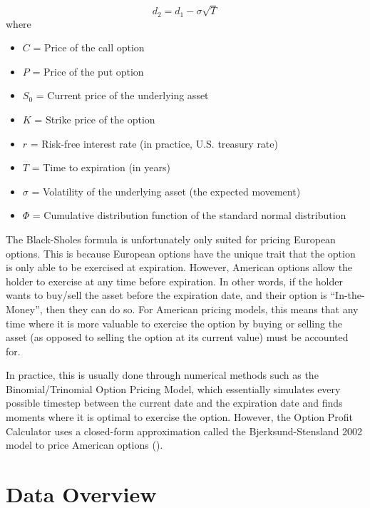 \documentclass{article}
\begin{document}
$$
d_2 = d_1 - \sigma \sqrt{T}
$$
where
\begin{itemize}
    \item $C$ = Price of the call option
    \item $P$ = Price of the put option
    \item $S_0$ = Current price of the underlying asset
    \item $K$ = Strike price of the option
    \item $r$ = Risk-free interest rate (in practice, U.S. treasury rate)
    \item $T$ = Time to expiration (in years)
    \item $\sigma$ = Volatility of the underlying asset (the expected movement)
    \item $\Phi$ = Cumulative distribution function of the standard normal distribution

\end{itemize}

The Black-Sholes formula is unfortunately only suited for pricing European options. This is because European options have the unique trait that the option is only able to be exercised at expiration. However, American options allow the holder to exercise at any time before expiration. In other words, if the holder wants to buy/sell the asset before the expiration date, and their option is \enquote{In-the-Money}, then they can do so. For American pricing models, this means that any time where it is more valuable to exercise the option by buying or selling the asset (as opposed to selling the option at its current value) must be accounted for. 

\indent In practice, this is usually done through numerical methods such as the Binomial/Trinomial Option Pricing Model, which essentially simulates every possible timestep between the current date and the expiration date and finds moments where it is optimal to exercise the option. However, the Option Profit Calculator uses a closed-form approximation called the Bjerksund-Stensland 2002 model to price American options (\cite{bjerksundstens}). 



\section{Data Overview}
\end{document}
